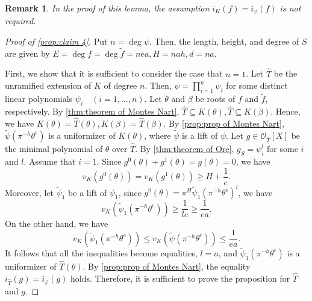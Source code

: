 \documentclass[10pt,a4paper]{amsart}
\newtheorem{remark}[theorem]{Remark}
\numberwithin{equation}{section}
\begin{document}
  \begin{remark}
    In the proof of this lemma, the assumption $i_K(f) = i_{\varphi}(f)$ is not required. 
  \end{remark}

  \begin{proof}[Proof of \cref{prop:claim 4}]
    Put $n = \deg \psi$. Then, the length, height, and degree of $S$ are given by 
    $E = \deg f = \deg \tilde{f} = nea, H = nah, d = na$. 

    First, we show that it is sufficient to consider the case that $n = 1$. 
    Let $\hat{T}$ be the unramified extension of $K$ of degree $n$. 
    Then, $\psi = \prod_{i = 1}^n \psi_i$ for some distinct linear polynomials $\psi_i \quad (i = 1, \dots ,n)$. 
    Let $\theta$ and $\beta$ be roots of $f$ and $\tilde{f}$, respectively. 
    By \cref{thm:theorem of Montes Nart}, $\hat{T} \subseteq K(\theta), \hat{T} \subseteq K(\beta)$. 
    Hence, we have $K(\theta) = \hat{T}(\theta), K(\beta) = \hat{T}(\beta)$. 
    By \cref{prop:prop of Montes Nart}, $\tilde{\psi}(\pi^{-h}\theta^e)$ is a uniformizer of $K(\theta)$, where $\tilde{\psi}$ is a lift of $\psi$. 
    Let $g \in \mathcal{O}_{\hat{T}}[X]$ be the minimal polynomial of $\theta$ over $\hat{T}$. 
    By \cref{thm:theorem of Ore}, $g_S = \psi_i^l$ for some $i$ and $l$. 
    Assume that $i = 1$. 
    Since $g^0(\theta) + g^1(\theta) = g(\theta) = 0$, we have 
    \[
      v_K(g^0(\theta)) = v_K(g^1(\theta)) \ge H + \frac{1}{e}. 
    \]
    Moreover, let $\tilde{\psi}_1$ be a lift of $\psi_1$, since $g^0(\theta) = \pi^H\tilde{\psi}_1(\pi^{-h}\theta^e)^l$, 
    we have 
    \[
      v_K(\tilde{\psi}_1(\pi^{-h}\theta^e)) \ge \frac{1}{le} \ge \frac{1}{ea}. 
    \]
    On the other hand, we have 
    \[
      v_K(\tilde{\psi}_1(\pi^{-h}\theta^e)) \le v_K(\tilde{\psi}(\pi^{-h}\theta^e)) \le \frac{1}{ea}. 
    \]
    It follows that all the inequalities become equalities, $l = a$, and $\tilde{\psi}_1(\pi^{-h}\theta^e)$ is a uniformizer of $\hat{T}(\theta)$. 
    By \cref{prop:prop of Montes Nart}, the equality $i_{\hat{T}}(g) = i_{\varphi}(g)$ holds. 
    Therefore, it is sufficient to prove the proposition for $\hat{T}$ and $g$. 


\end{proof}
\end{document}
